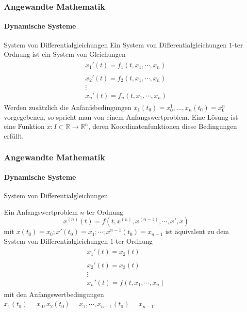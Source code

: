 \documentclass{beamer}
\begin{document}
\begin{frame}
    \frametitle{Angewandte Mathematik}
\framesubtitle{Dynamische Systeme }
\begin{block}{System von Differentialgleichungen}
Ein System von Differentialgleichungen $1$-ter Ordnung ist ein System von Gleichungen
\begin{align*}
\begin{matrix} x_1'(t) = f_1(t, x_1, \cdots, x_n ) \\  \\ x_2'(t) = f_2(t, x_1, \cdots, x_n ) \\  \vdots \\  x_n'(t) = f_n(t, x_1, \cdots, x_n )\end{matrix}
\end{align*}
Werden zusätzlich die Anfanfsbedingungen $x_1(t_0)= x_0^1, \dots ,  x_n(t_0) = x_0^n$ vorgegebenen, so spricht man von einem Anfangswertproblem.
Eine Lösung ist eine Funktion $x : I \subset \mathbb{R} \to \mathbb{R}^n$, deren Koordinatenfunktionen diese Bedingungen erfüllt.
\end{block}
 \end{frame}

\begin{frame}
    \frametitle{Angewandte Mathematik}
\framesubtitle{Dynamische Systeme }
\begin{block}{System von Differentialgleichungen}

Ein Anfangswertproblem $n$-ter Ordnung
 $$ x^{(n)}(t) = f(t, x^{(n)}, x^{(n-1)} , \cdots , x', x) $$ mit  $x(t_0) = x_0 ; x'(t_0) = x_1; \cdots ; x^{n-1}(t_{0})= x_{n-1}  $ ist äquivalent zu dem System von   Differentialgleichungen $1$-ter Ordnung
\begin{align*}
\begin{matrix} x_1'(t) = x_2(t) \\  \\ x_2'(t) = x_3(t) \\  \vdots  \\ x_n'(t) = f(t, x_1, \cdots, x_n )\end{matrix}
\end{align*}
mit den Anfangswertbedingungen  $x_1(t_0) = x_0 , x_2(t_0) = x_1, \cdots , x_{n-1}(t_{0})= x_{n-1} $.
\end{block}


 \end{frame}
\end{document}
